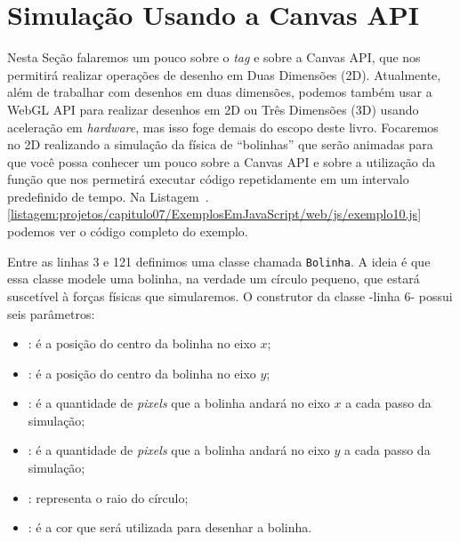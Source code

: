 \section{Simulação Usando a Canvas API}

Nesta Seção falaremos um pouco sobre o \textit{tag}  e sobre a Canvas API, que nos permitirá realizar operações de desenho em Duas Dimensões (2D). Atualmente, além de trabalhar com desenhos em duas dimensões, podemos também usar a WebGL API para realizar desenhos em 2D ou Três Dimensões (3D) usando aceleração em \textit{hardware}, mas isso foge demais do escopo deste livro. Focaremos no 2D realizando a simulação da física de ``bolinhas'' que serão animadas para que você possa conhecer um pouco sobre a Canvas API e sobre a utilização da função  que nos permetirá executar código repetidamente em um intervalo predefinido de tempo. Na Listagem~\thechapter.\ref{listagem:projetos/capitulo07/ExemplosEmJavaScript/web/js/exemplo10.js} podemos ver o código completo do exemplo.


Entre as linhas 3 e 121 definimos uma classe chamada \texttt{Bolinha}. A ideia é que essa classe modele uma bolinha, na verdade um círculo pequeno, que estará suscetível à forças físicas que simularemos. O construtor da classe -linha 6- possui seis parâmetros:

\begin{itemize}
    \item {}: é a posição do centro da bolinha no eixo $x$;
    \item {}: é a posição do centro da bolinha no eixo $y$;
    \item {}: é a quantidade de \textit{pixels} que a bolinha andará no eixo $x$ a cada passo da simulação;
    \item {}: é a quantidade de \textit{pixels} que a bolinha andará no eixo $y$ a cada passo da simulação;
    \item {}: representa o raio do círculo;
    \item {}: é a cor que será utilizada para desenhar a bolinha.
\end{itemize}


